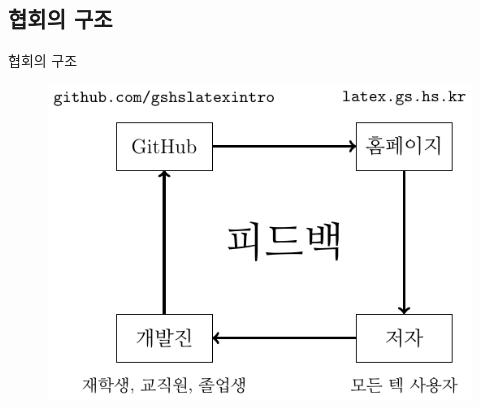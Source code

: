 \documentclass[12pt]{beamer}
\begin{document}
\subsection{협회의 구조}
\begin{frame}{협회의 구조}
	\begin{figure}[h]
		\centering
		\includegraphics[width=\textwidth]{gshstexsociety_structure.pdf}
	\end{figure}
\end{frame}
\end{document}
